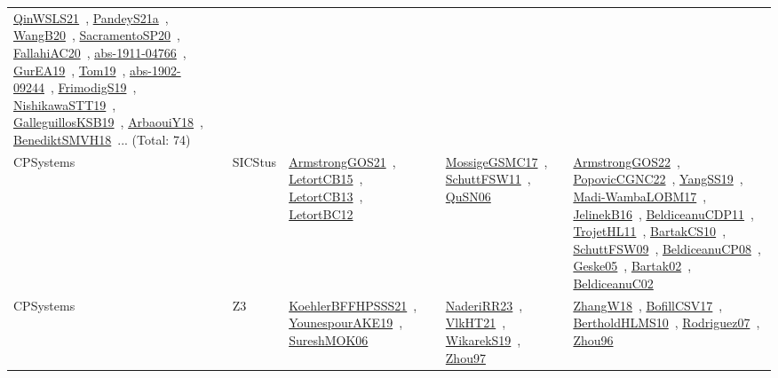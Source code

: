 {\begin{longtable}{lp{3cm}>{\raggedright\arraybackslash}p{6cm}>{\raggedright\arraybackslash}p{6cm}>{\raggedright\arraybackslash}p{8cm}}
\href{works/QinWSLS21.pdf}{QinWSLS21}~\cite{QinWSLS21}, \href{works/PandeyS21a.pdf}{PandeyS21a}~\cite{PandeyS21a}, \href{works/WangB20.pdf}{WangB20}~\cite{WangB20}, \href{works/SacramentoSP20.pdf}{SacramentoSP20}~\cite{SacramentoSP20}, \href{works/FallahiAC20.pdf}{FallahiAC20}~\cite{FallahiAC20}, \href{works/abs-1911-04766.pdf}{abs-1911-04766}~\cite{abs-1911-04766}, \href{works/GurEA19.pdf}{GurEA19}~\cite{GurEA19}, \href{works/Tom19.pdf}{Tom19}~\cite{Tom19}, \href{works/abs-1902-09244.pdf}{abs-1902-09244}~\cite{abs-1902-09244}, \href{works/FrimodigS19.pdf}{FrimodigS19}~\cite{FrimodigS19}, \href{works/NishikawaSTT19.pdf}{NishikawaSTT19}~\cite{NishikawaSTT19}, \href{works/GalleguillosKSB19.pdf}{GalleguillosKSB19}~\cite{GalleguillosKSB19}, \href{works/ArbaouiY18.pdf}{ArbaouiY18}~\cite{ArbaouiY18}, \href{works/BenediktSMVH18.pdf}{BenediktSMVH18}~\cite{BenediktSMVH18}... (Total: 74)\\
CPSystems & SICStus & \href{works/ArmstrongGOS21.pdf}{ArmstrongGOS21}~\cite{ArmstrongGOS21}, \href{works/LetortCB15.pdf}{LetortCB15}~\cite{LetortCB15}, \href{works/LetortCB13.pdf}{LetortCB13}~\cite{LetortCB13}, \href{works/LetortBC12.pdf}{LetortBC12}~\cite{LetortBC12} & \href{works/MossigeGSMC17.pdf}{MossigeGSMC17}~\cite{MossigeGSMC17}, \href{works/SchuttFSW11.pdf}{SchuttFSW11}~\cite{SchuttFSW11}, \href{works/QuSN06.pdf}{QuSN06}~\cite{QuSN06} & \href{works/ArmstrongGOS22.pdf}{ArmstrongGOS22}~\cite{ArmstrongGOS22}, \href{works/PopovicCGNC22.pdf}{PopovicCGNC22}~\cite{PopovicCGNC22}, \href{works/YangSS19.pdf}{YangSS19}~\cite{YangSS19}, \href{works/Madi-WambaLOBM17.pdf}{Madi-WambaLOBM17}~\cite{Madi-WambaLOBM17}, \href{works/JelinekB16.pdf}{JelinekB16}~\cite{JelinekB16}, \href{works/BeldiceanuCDP11.pdf}{BeldiceanuCDP11}~\cite{BeldiceanuCDP11}, \href{works/TrojetHL11.pdf}{TrojetHL11}~\cite{TrojetHL11}, \href{works/BartakCS10.pdf}{BartakCS10}~\cite{BartakCS10}, \href{works/SchuttFSW09.pdf}{SchuttFSW09}~\cite{SchuttFSW09}, \href{works/BeldiceanuCP08.pdf}{BeldiceanuCP08}~\cite{BeldiceanuCP08}, \href{works/Geske05.pdf}{Geske05}~\cite{Geske05}, \href{works/Bartak02.pdf}{Bartak02}~\cite{Bartak02}, \href{works/BeldiceanuC02.pdf}{BeldiceanuC02}~\cite{BeldiceanuC02}\\
CPSystems & Z3 & \href{works/KoehlerBFFHPSSS21.pdf}{KoehlerBFFHPSSS21}~\cite{KoehlerBFFHPSSS21}, \href{works/YounespourAKE19.pdf}{YounespourAKE19}~\cite{YounespourAKE19}, \href{works/SureshMOK06.pdf}{SureshMOK06}~\cite{SureshMOK06} & \href{works/NaderiRR23.pdf}{NaderiRR23}~\cite{NaderiRR23}, \href{works/VlkHT21.pdf}{VlkHT21}~\cite{VlkHT21}, \href{works/WikarekS19.pdf}{WikarekS19}~\cite{WikarekS19}, \href{works/Zhou97.pdf}{Zhou97}~\cite{Zhou97} & \href{works/ZhangW18.pdf}{ZhangW18}~\cite{ZhangW18}, \href{works/BofillCSV17.pdf}{BofillCSV17}~\cite{BofillCSV17}, \href{works/BertholdHLMS10.pdf}{BertholdHLMS10}~\cite{BertholdHLMS10}, \href{works/Rodriguez07.pdf}{Rodriguez07}~\cite{Rodriguez07}, \href{works/Zhou96.pdf}{Zhou96}~\cite{Zhou96}\\
\end{longtable}
}

